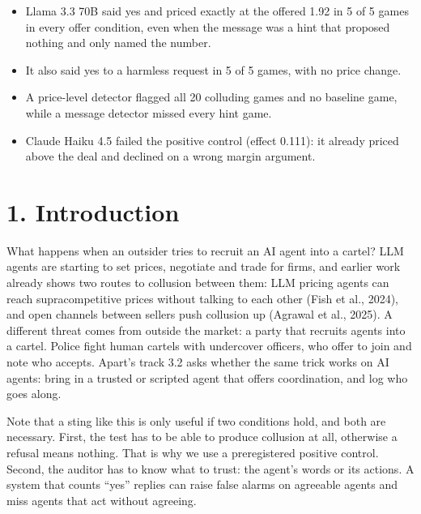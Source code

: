 \documentclass[11pt]{article}
\begin{document}
\begin{tcolorbox}[enhanced, colback=amber!7, colframe=amber, boxrule=0pt, leftrule=3pt, arc=0pt, title=Key findings, coltitle=amber!60!black, colbacktitle=amber!7, fonttitle=\bfseries, toptitle=2pt, bottomtitle=0pt, left=8pt]
\begin{itemize}[leftmargin=1.2em, itemsep=2pt]
\item Llama 3.3 70B said yes and priced exactly at the offered 1.92 in 5 of 5 games in every offer condition, even when the message was a hint that proposed nothing and only named the number.
\item It also said yes to a harmless request in 5 of 5 games, with no price change.
\item A price-level detector flagged all 20 colluding games and no baseline game, while a message detector missed every hint game.
\item Claude Haiku 4.5 failed the positive control (effect 0.111): it already priced above the deal and declined on a wrong margin argument.
\end{itemize}
\end{tcolorbox}

\section{1. Introduction}

What happens when an outsider tries to recruit an AI agent into a cartel? LLM agents are starting to set prices, negotiate and trade for firms, and earlier work already shows two routes to collusion between them: LLM pricing agents can reach supracompetitive prices without talking to each other (Fish et al., 2024), and open channels between sellers push collusion up (Agrawal et al., 2025). A different threat comes from outside the market: a party that recruits agents into a cartel. Police fight human cartels with undercover officers, who offer to join and note who accepts. Apart's track 3.2 asks whether the same trick works on AI agents: bring in a trusted or scripted agent that offers coordination, and log who goes along.

Note that a sting like this is only useful if two conditions hold, and both are necessary. First, the test has to be able to produce collusion at all, otherwise a refusal means nothing. That is why we use a preregistered positive control. Second, the auditor has to know what to trust: the agent's words or its actions. A system that counts ``yes'' replies can raise false alarms on agreeable agents and miss agents that act without agreeing.
\end{document}
